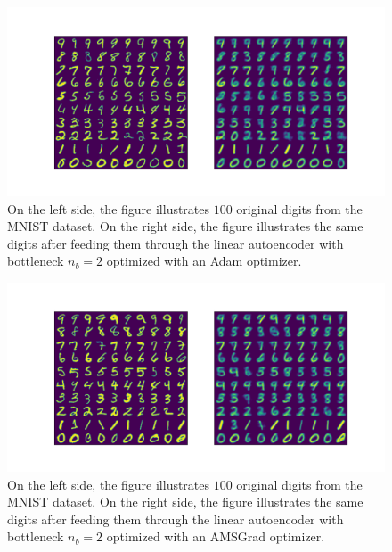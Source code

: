 \begin{figure}
\begin{center}
   \begin{minipage}[b]{\linewidth}
      \includegraphics[trim = 15mm 10mm 15mm 15mm, clip, width=\linewidth]{linear_AE_2d_adam_inference}
	\end{minipage}
\end{center}
\caption{On the left side, the figure illustrates $100$ original digits from the MNIST dataset. On the right side, the figure illustrates the same digits after feeding them through the linear autoencoder with bottleneck $n_b=2$ optimized with an Adam optimizer.}\label{fig:linear_AE_2d_adam_inference}
\end{figure}


\begin{figure}
\begin{center}
   \begin{minipage}[b]{\linewidth}
      \includegraphics[trim = 15mm 10mm 15mm 15mm, clip, width=\linewidth]{linear_AE_2d_amsgrad_inference}
	\end{minipage}
\end{center}
\caption{On the left side, the figure illustrates $100$ original digits from the MNIST dataset. On the right side, the figure illustrates the same digits after feeding them through the linear autoencoder with bottleneck $n_b=2$ optimized with an AMSGrad optimizer.}\label{fig:linear_AE_2d_amsgrad_inference}
\end{figure}


